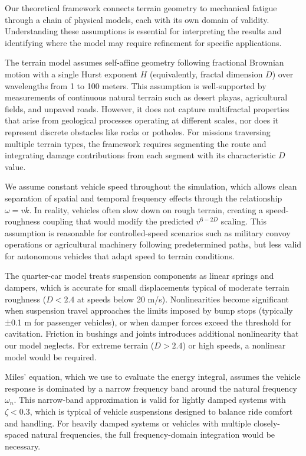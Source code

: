 \documentclass[11pt,letterpaper]{article}
\begin{document}
Our theoretical framework connects terrain geometry to mechanical fatigue through a chain of physical models, each with its own domain of validity. Understanding these assumptions is essential for interpreting the results and identifying where the model may require refinement for specific applications.

The terrain model assumes self-affine geometry following fractional Brownian motion with a single Hurst exponent $H$ (equivalently, fractal dimension $D$) over wavelengths from 1 to 100 meters. This assumption is well-supported by measurements of continuous natural terrain such as desert playas, agricultural fields, and unpaved roads. However, it does not capture multifractal properties that arise from geological processes operating at different scales, nor does it represent discrete obstacles like rocks or potholes. For missions traversing multiple terrain types, the framework requires segmenting the route and integrating damage contributions from each segment with its characteristic $D$ value.

We assume constant vehicle speed throughout the simulation, which allows clean separation of spatial and temporal frequency effects through the relationship $\omega = vk$. In reality, vehicles often slow down on rough terrain, creating a speed-roughness coupling that would modify the predicted $v^{6-2D}$ scaling. This assumption is reasonable for controlled-speed scenarios such as military convoy operations or agricultural machinery following predetermined paths, but less valid for autonomous vehicles that adapt speed to terrain conditions.

The quarter-car model treats suspension components as linear springs and dampers, which is accurate for small displacements typical of moderate terrain roughness ($D < 2.4$ at speeds below 20 m/s). Nonlinearities become significant when suspension travel approaches the limits imposed by bump stops (typically ±0.1 m for passenger vehicles), or when damper forces exceed the threshold for cavitation. Friction in bushings and joints introduces additional nonlinearity that our model neglects. For extreme terrain ($D > 2.4$) or high speeds, a nonlinear model would be required.

Miles' equation, which we use to evaluate the energy integral, assumes the vehicle response is dominated by a narrow frequency band around the natural frequency $\omega_n$. This narrow-band approximation is valid for lightly damped systems with $\zeta < 0.3$, which is typical of vehicle suspensions designed to balance ride comfort and handling. For heavily damped systems or vehicles with multiple closely-spaced natural frequencies, the full frequency-domain integration would be necessary.
\end{document}
